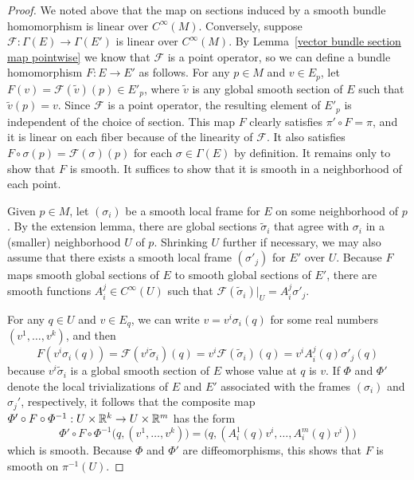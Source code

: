 \begin{proof}
We noted above that the map on sections induced by a smooth bundle homomorphism
is linear over $C^\infty(M)$. Conversely, suppose $\mathcal{F}:\Gamma(E)\to\Gamma(E')$ is linear over $C^\infty(M)$. By Lemma~\ref{vector bundle section map pointwise} 
we know that $\mathcal{F}$ is a point operator, so we can define a bundle homomorphism $F:E\to E'$ as follows. For any $p\in M$ and $v\in E_p$, let 
$F(v)=\mathcal{F}(\widetilde{v})(p)\in E'_p$, where $\widetilde{v}$ is any global smooth section of $E$ such that $\widetilde{v}(p)=v$. Since $\mathcal{F}$ is a point 
operator, the resulting element of $E'_p$ is independent of the choice of section. This map $F$ clearly satisfies $\pi'\circ F=\pi$, and it is linear on each fiber 
because of the linearity of $\mathcal{F}$. It also satisfies $F\circ\sigma(p)=\mathcal{F}(\sigma)(p)$ for each $\sigma\in\Gamma(E)$ by definition. It remains only to 
show that $F$ is smooth. It suffices to show that it is smooth in a neighborhood of each point.\par
Given $p\in M$, let $(\sigma_i)$ be a smooth local frame for $E$ on some neighborhood of $p$. By the extension lemma, there are global sections $\widetilde{\sigma}_i$ 
that agree with $\sigma_i$ in a (smaller) neighborhood $U$ of $p$. Shrinking $U$ further if necessary, we may also assume that there exists a smooth local frame 
$(\sigma'_j)$ for $E'$ over $U$. Because $F$ maps smooth global sections of $E$ to smooth global sections of $E'$, there are smooth functions $A_i^j\in C^\infty(U)$ 
such that $\mathcal{F}(\widetilde{\sigma}_i)|_U=A_i^j\sigma'_j$.\par
For any $q\in U$ and $v\in E_q$, we can write $v=v^i\sigma_i(q)$ for some real numbers $(v^1,\dots,v^k)$, and then
\[F(v^i\sigma_i(q))=\mathcal{F}(v^i\widetilde{\sigma}_i)(q)=v^i\mathcal{F}(\widetilde{\sigma}_i)(q)=v^iA_i^j(q)\sigma'_j(q)\]
because $v^i\widetilde{\sigma}_i$ is a global smooth section of $E$ whose value at $q$ is $v$. If $\varPhi$ and $\varPhi'$ denote the local trivializations of $E$ and 
$E'$ associated with the frames $(\sigma_i)$ and $\sigma_j'$, respectively, it follows that the composite map 
$\varPhi'\circ F\circ\varPhi^{-1}:U\times\mathbb{R}^k\to U\times\mathbb{R}^m$ has the form
\[\varPhi'\circ F\circ\varPhi^{-1}\big(q,(v^1,\dots,v^k)\big)=\big(q,(A_i^1(q)v^i,\dots,A_i^m(q)v^i)\big)\]
which is smooth. Because $\varPhi$ and $\varPhi'$ are diffeomorphisms, this shows that $F$ is smooth on $\pi^{-1}(U)$.
\end{proof}
